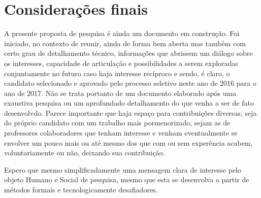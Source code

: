 \documentclass[
	11pt,				%
	openany,			%
	oneside,			%
	a4paper,			%
	english,			%
	french,				%
	spanish,			%
	brazil,				%
	]{abntex2}
\begin{document}
\chapter*[Considerações finais]{Considerações finais}

A presente proposta de pesquisa é ainda um documento em construção. Foi iniciado, no contexto de reunir, ainda de forma bem aberta mas também com certo grau de detalhamento técnico, informações que abrissem um diálogo sobre os interesses, capacidade de articulação e possibilidades a serem exploradas conjuntamente no futuro caso haja interesse recíproco e sendo, é claro, o candidato selecionado e aprovado pelo processo seletivo neste ano de 2016 para o ano de 2017. Não se trata portanto de um documento elaborado após uma exaustiva pesquisa ou um aprofundado detalhamento do que venha a ser de fato desenvolvdo. Parece importante que haja espaço para contribuições diversas, seja do próprio candidato com um trabalho mais pormenorizado, sejam as de professores colaboradores que tenham interesse e venham eventualmente se envolver um pouco mais ou até mesmo dos que com ou sem experência acabem, voluntariamente ou não, deixando sua contribuição.

Espero que mesmo simplificadamente uma mensagem clara de interesse pelo objeto Humano e Social de pesquisa, mesmo que esta se desenvolva a partir de métodos formais e tecnologicamente desafiadores.

\postextual



%
%



\end{document}
